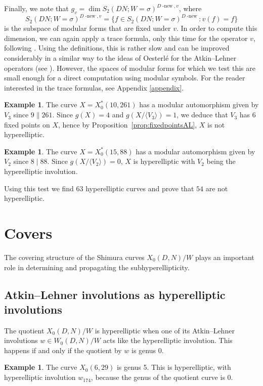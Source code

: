 \documentclass[12pt]{amsart}
\newcommand{\Dnew}{D\operatorname{-new}}
\numberwithin{equation}{subsection}
\theoremstyle{plain}\newtheorem{ithm}{Theorem}
\theoremstyle{plain}\newtheorem{iprop}[ithm]{Proposition}
\theoremstyle{definition}
\newtheorem{example}[equation]{Example}
\theoremstyle{remark}
\newcommand{\Curve}[2]{X_0({#1},{#2})} %
\newcommand{\StarCurve}[2]{X_0^*({#1},{#2})} %
\newcommand{\ALfull}[2]{W_0({#1},{#2})} %
\begin{document}
Finally, we note that $g_v = \dim S_2(DN; W = \sigma)^{\Dnew, v}$, where 
$$
S_2(DN; W = \sigma)^{\Dnew, v} = \{ f \in S_2(DN; W = \sigma)^{\Dnew} : v(f) = f \}
$$
is the subspace of modular forms that are fixed under $v$.
In order to compute this dimension, we can again apply a trace formula, only this time for the operator $v$, following \cite{PopaI}. Using the definitions, this is rather slow and can be improved considerably in a similar way to the ideas of Oesterl{\'e} for the Atkin--Lehner operators (see \cite[\S 4]{PopaII}). However, the spaces of modular forms for which we test this are small enough for a direct computation using modular symbols. For the reader interested in the trace formulas, see Appendix \ref{appendix}.


\begin{example}
    The curve $X = \StarCurve{10}{261}$ has a modular automorphism given by $V_3$ since $9 \parallel 261$. Since $g(X) = 4$ and $g(X/ \langle V_3 \rangle) = 1$, we deduce that $V_3$ has $6$ fixed points on $X$, hence by Proposition~\ref{prop:fixedpointsAL}, $X$ is not hyperelliptic.
\end{example}

\begin{example}
    The curve $X = \StarCurve{15}{88}$ has a modular automorphism given by $V_2$ since $8 \mid 88$. Since $g(X / \langle V_2 \rangle) = 0$, $X$ is hyperelliptic with $V_2$ being the hyperelliptic involution. 
\end{example}

Using this test we find $63$ hyperelliptic curves and prove that $54$ are not hyperelliptic.

\section{Covers}
\label{sec:covers}
The covering structure of the Shimura curves $\Curve{D}{N}/W$ plays an important role in determining and propagating the subhyperellipticity.
\subsection{Atkin--Lehner involutions as hyperelliptic involutions}
\label{sec:ALashyp}
The quotient $\Curve{D}{N}/W$ is hyperelliptic when one of its Atkin--Lehner involutions $w \in \ALfull{D}{N} / W$ acts like the hyperelliptic involution. This happens if and only if the quotient by $w$ is genus 0.
\begin{example}
\label{ex:coveringhypAL}
The curve $\Curve{6}{29}$ is genus 5. This is hyperelliptic, with hyperelliptic involution $w_{174}$, because the genus of the quotient curve is 0.
\end{example}
\end{document}
